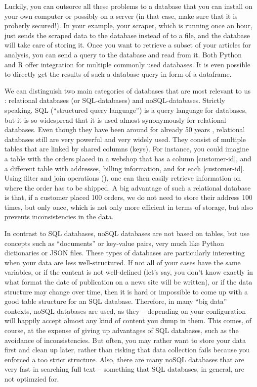 Luckily, you can outsorce all these problems to a database that you can
install on your own computer or possibly on a server (in that case, make
sure that it is proberly secured!). In your example, your scraper, which
is running once an hour, just sends the scraped data to the database
instead of to a file, and the database will take care of storing it.
Once you want to retrieve a subset of your articles for analysis,
you can send a query to the database and read from it. Both Python and
R offer integration for multiple commonly used databases. It is even
possible to directly get the results of such a database query in
form of a dataframe.

We can distinguish two main categories of databases
that are most relevant to us \citep[see also][]{Gunther2018}:
relational databases (or SQL-databases) and noSQL-databases. Strictly
speaking, SQL (``structured query language'') is a query language for
databases, but it is so widespread that it is used almost synonymously
for relational databases. Even though they have been around for
already 50 years \cite{Codd1970}, relational databases still are very
powerful and very widely used.  They consist of multiple tables that
are linked by shared columns (keys). For instance, you could imagine a
table with the orders placed in a webshop that has a column
|customer-id|, and a different table with addresses, billing
information, and for each |customer-id|. Using filter and join
operations (), one can then easily retrieve
information on where the order has to be shipped. A big advantage of
such a relational database is that, if a customer placed 100 orders,
we do not need to store their address 100 times, but only once, which
is not only more efficient in terms of storage, but also prevents
inconsistencies in the data.

In contrast to SQL databases, noSQL databases are not based on tables,
but use concepts such as ``documents'' or key-value pairs, very much
like Python dictionaries or JSON files. These types of databases are
particularly interesting when your data are less well-structured. If
not all of your cases have the same variables, or if the content is not
well-defined (let's say, you don't know exactly in what format the date
of publication on a news site will be written), or if the data structure
may change over time, then it is hard or impossible to come up with a
good table structure for an SQL database. Therefore, in many ``big data''
contexts, noSQL databases are used, as they -- depending on your
configuration -- will happily accept almost any kind of content you dump
in them. This comes, of course, at the expense of giving up advantages
of SQL databases, such as the avoidance of inconsistencies. But often,
you may rather want to store your data first and clean up later, rather
than risking that data collection fails because you enforced a too strict
structure. Also, there are many noSQL databases that are very fast in
searching full text -- something that SQL databases, in general, are
not optimzied for.

